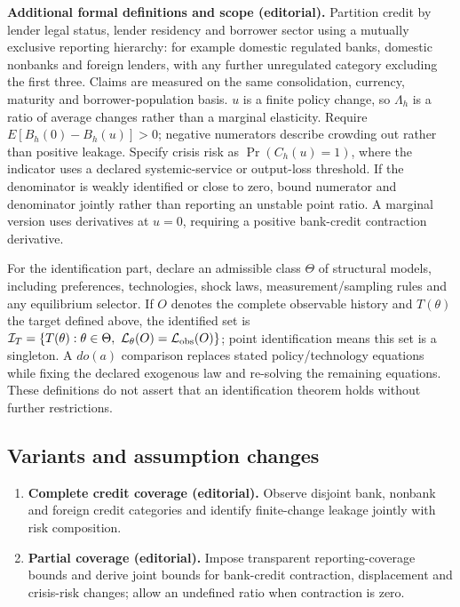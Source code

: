 \documentclass[11pt,a4paper]{article}
\begin{document}
\textbf{Additional formal definitions and scope (editorial).} Partition credit by lender legal status, lender residency and borrower sector using a mutually exclusive reporting hierarchy: for example domestic regulated banks, domestic nonbanks and foreign lenders, with any further unregulated category excluding the first three. Claims are measured on the same consolidation, currency, maturity and borrower-population basis. \(u\) is a finite policy change, so \(\Lambda_h\) is a ratio of average changes rather than a marginal elasticity. Require \(E[B_h(0)-B_h(u)]>0\); negative numerators describe crowding out rather than positive leakage. Specify crisis risk as \(\Pr(C_h(u)=1)\), where the indicator uses a declared systemic-service or output-loss threshold. If the denominator is weakly identified or close to zero, bound numerator and denominator jointly rather than reporting an unstable point ratio. A marginal version uses derivatives at \(u=0\), requiring a positive bank-credit contraction derivative.

For the identification part, declare an admissible class \(\Theta\) of structural models, including preferences, technologies, shock laws, measurement/sampling rules and any equilibrium selector. If \(O\) denotes the complete observable history and \(T(\theta)\) the target defined above, the identified set is \(\mathcal I_T=\{T(\theta):\theta\in\Theta,\ \mathcal L_\theta(O)=\mathcal L_{\rm obs}(O)\}\); point identification means this set is a singleton. A \(do(a)\) comparison replaces stated policy/technology equations while fixing the declared exogenous law and re-solving the remaining equations. These definitions do not assert that an identification theorem holds without further restrictions.
\subsection*{Variants and assumption changes}
\begin{enumerate}
\item \textbf{Complete credit coverage (editorial).} Observe disjoint bank, nonbank and foreign credit categories and identify finite-change leakage jointly with risk composition.
\item \textbf{Partial coverage (editorial).} Impose transparent reporting-coverage bounds and derive joint bounds for bank-credit contraction, displacement and crisis-risk changes; allow an undefined ratio when contraction is zero.
\end{enumerate}
\end{document}
